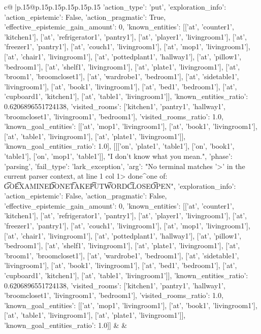 \documentclass{article}
\begin{document}
{\begin{supertabular}{c@{$\;$}|p{.15\linewidth}@{}p{.15\linewidth}p{.15\linewidth}p{.15\linewidth}p{.15\linewidth}p{.15\linewidth}}
{{{{'action_type': 'put', 'exploration_info': {'action_epistemic': False, 'action_pragmatic': True, 'effective_epistemic_gain_amount': 0, 'known_entities': [['at', 'counter1', 'kitchen1'], ['at', 'refrigerator1', 'pantry1'], ['at', 'player1', 'livingroom1'], ['at', 'freezer1', 'pantry1'], ['at', 'couch1', 'livingroom1'], ['at', 'mop1', 'livingroom1'], ['at', 'chair1', 'livingroom1'], ['at', 'pottedplant1', 'hallway1'], ['at', 'pillow1', 'bedroom1'], ['at', 'shelf1', 'livingroom1'], ['at', 'plate1', 'livingroom1'], ['at', 'broom1', 'broomcloset1'], ['at', 'wardrobe1', 'bedroom1'], ['at', 'sidetable1', 'livingroom1'], ['at', 'book1', 'livingroom1'], ['at', 'bed1', 'bedroom1'], ['at', 'cupboard1', 'kitchen1'], ['at', 'table1', 'livingroom1']], 'known_entities_ratio': 0.6206896551724138, 'visited_rooms': ['kitchen1', 'pantry1', 'hallway1', 'broomcloset1', 'livingroom1', 'bedroom1'], 'visited_rooms_ratio': 1.0, 'known_goal_entities': [['at', 'mop1', 'livingroom1'], ['at', 'book1', 'livingroom1'], ['at', 'table1', 'livingroom1'], ['at', 'plate1', 'livingroom1']], 'known_goal_entities_ratio': 1.0}}], [[['on', 'plate1', 'table1'], ['on', 'book1', 'table1'], ['on', 'mop1', 'table1']], "I don't know what you mean.", {'phase': 'parsing', 'fail_type': 'lark_exception', 'arg': "No terminal matches '>' in the current parser context, at line 1 col 1\n\n> done\n^\nExpected one of: \n\t* GO\n\t* EXAMINE\n\t* DONE\n\t* TAKE\n\t* PUT\n\t* WORD\n\t* CLOSE\n\t* OPEN\n", 'exploration_info': {'action_epistemic': False, 'action_pragmatic': False, 'effective_epistemic_gain_amount': 0, 'known_entities': [['at', 'counter1', 'kitchen1'], ['at', 'refrigerator1', 'pantry1'], ['at', 'player1', 'livingroom1'], ['at', 'freezer1', 'pantry1'], ['at', 'couch1', 'livingroom1'], ['at', 'mop1', 'livingroom1'], ['at', 'chair1', 'livingroom1'], ['at', 'pottedplant1', 'hallway1'], ['at', 'pillow1', 'bedroom1'], ['at', 'shelf1', 'livingroom1'], ['at', 'plate1', 'livingroom1'], ['at', 'broom1', 'broomcloset1'], ['at', 'wardrobe1', 'bedroom1'], ['at', 'sidetable1', 'livingroom1'], ['at', 'book1', 'livingroom1'], ['at', 'bed1', 'bedroom1'], ['at', 'cupboard1', 'kitchen1'], ['at', 'table1', 'livingroom1']], 'known_entities_ratio': 0.6206896551724138, 'visited_rooms': ['kitchen1', 'pantry1', 'hallway1', 'broomcloset1', 'livingroom1', 'bedroom1'], 'visited_rooms_ratio': 1.0, 'known_goal_entities': [['at', 'mop1', 'livingroom1'], ['at', 'book1', 'livingroom1'], ['at', 'table1', 'livingroom1'], ['at', 'plate1', 'livingroom1']], 'known_goal_entities_ratio': 1.0}}]] 
	  } 
	   } 
	   } 
	 & & \\ 
 


\end{supertabular}}
\end{document}

